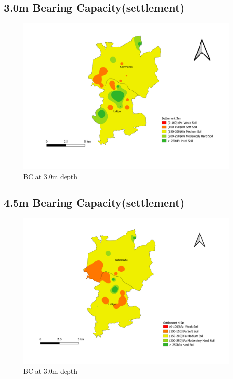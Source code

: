 \begin{landscape}
\section{3.0m Bearing Capacity(settlement)}
\begin{figure}[!hbt]
\centering
\includegraphics[width=0.8\linewidth, height=0.8\textheight,keepaspectratio]{in/map/Deflection_3_0.png}
\caption{BC at 3.0m depth}
\end{figure}
\pagebreak
\end{landscape}

\begin{landscape}
\section{4.5m Bearing Capacity(settlement)}
\begin{figure}[!hbt]
\centering
\includegraphics[width=0.8\linewidth, height=0.8\textheight,keepaspectratio]{in/map/Deflection_4_5.png}
\caption{BC at 3.0m depth}
\end{figure}
\pagebreak
\end{landscape}

